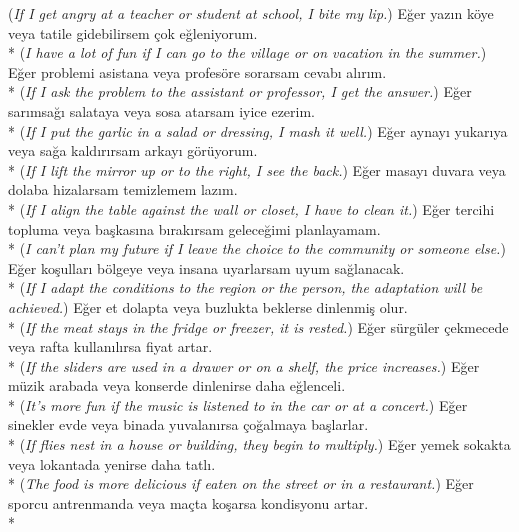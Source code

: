 ({\it If I get angry at a teacher or student at school, I bite my lip.})
\ex E\u{g}er yaz{\i}n k\"{o}ye veya tatile gidebilirsem \c{c}ok e\u{g}leniyorum. \\*
({\it I have a lot of fun if I can go to the village or on vacation in the summer.})
\ex E\u{g}er problemi asistana veya profes\"{o}re sorarsam cevab{\i} al{\i}r{\i}m. \\*
({\it If I ask the problem to the assistant or professor, I get the answer.})
\ex E\u{g}er sar{\i}msa\u{g}{\i} salataya veya sosa atarsam iyice ezerim. \\*
({\it If I put the garlic in a salad or dressing, I mash it well.})
\ex E\u{g}er aynay{\i} yukar{\i}ya veya sa\u{g}a kald{\i}r{\i}rsam arkay{\i} g\"{o}r\"{u}yorum. \\*
({\it If I lift the mirror up or to the right, I see the back.})
\ex E\u{g}er masay{\i} duvara veya dolaba hizalarsam temizlemem laz{\i}m. \\*
({\it If I align the table against the wall or closet, I have to clean it.})
\ex E\u{g}er tercihi topluma veya ba\c{s}kas{\i}na b{\i}rak{\i}rsam gelece\u{g}imi planlayamam. \\*
({\it I can't plan my future if I leave the choice to the community or someone else.})
\ex E\u{g}er ko\c{s}ullar{\i} b\"{o}lgeye veya insana uyarlarsam uyum sa\u{g}lanacak. \\*
({\it If I adapt the conditions to the region or the person, the adaptation will be achieved.})
\ex E\u{g}er et dolapta veya buzlukta beklerse dinlenmi\c{s} olur. \\*
({\it If the meat stays in the fridge or freezer, it is rested.})
\ex E\u{g}er s\"{u}rg\"{u}ler \c{c}ekmecede veya rafta kullan{\i}l{\i}rsa fiyat artar. \\*
({\it If the sliders are used in a drawer or on a shelf, the price increases.})
\ex E\u{g}er m\"{u}zik arabada veya konserde dinlenirse daha e\u{g}lenceli. \\*
({\it It's more fun if the music is listened to in the car or at a concert.})
\ex E\u{g}er sinekler evde veya binada yuvalan{\i}rsa \c{c}o\u{g}almaya ba\c{s}larlar. \\*
({\it If flies nest in a house or building, they begin to multiply.})
\ex E\u{g}er yemek sokakta veya lokantada yenirse daha tatl{\i}. \\*
({\it The food is more delicious if eaten on the street or in a restaurant.})
\ex E\u{g}er sporcu antrenmanda veya ma\c{c}ta ko\c{s}arsa kondisyonu artar. \\*
